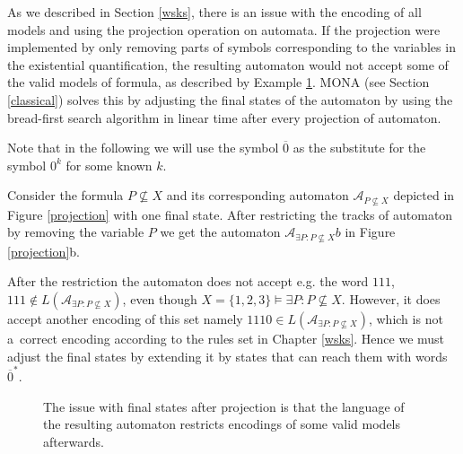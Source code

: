 As we described in Section \ref{wsks}, there is an issue with the encoding of
all models and using the projection operation on automata. If the projection
were implemented by only removing parts of symbols corresponding to the
variables in the existential quantification, the resulting automaton
would not accept some of the valid models of formula,
as described by Example \ref{models}. \textsc{MONA} (see Section
\ref{classical}) solves this by adjusting the final states of the automaton by
using the bread-first search algorithm in linear time after every projection of
automaton.

Note that in the following we will use the symbol $\overline{0}$ as the
substitute for the symbol $0^k$ for some known $k$.

\noindent\hrulefill
\begin{example}
 Consider the formula $P \not\subseteq X$ and its corresponding automaton
 $\mathcal{A}_{P \not\subseteq X}$ depicted in Figure \ref{projection} with
 one final state.
 After restricting the tracks of automaton by removing the variable $P$ we get
 the automaton $\mathcal{A}_{\exists P: P \not\subseteq X}b$ in Figure
 \ref{projection}b.
 
 After the restriction the automaton does not accept e.g. the word $111$, $111
 \notin L(\mathcal{A}_{\exists P: P \not\subseteq X})$, even though $X = \{1, 2,
 3\} \models \exists P: P \not\subseteq X$. However, it does accept another
 encoding of this set namely $1110 \in L(\mathcal{A}_{\exists P: P \not\subseteq
 X})$, which is not a~correct encoding according to the rules set in Chapter
 \ref{wsks}. Hence we must adjust the final states by extending it by states
 that can reach them with words $\overline{0}^*$.
 \begin{figure}[h!]
  \begin{center}
  \end{center}
  \caption{The issue with final states after projection is that
  the language of the resulting automaton restricts encodings
  of some valid models afterwards.}\label{projection}\label{models}
 \end{figure}\end{example}\noindent\hrulefill

